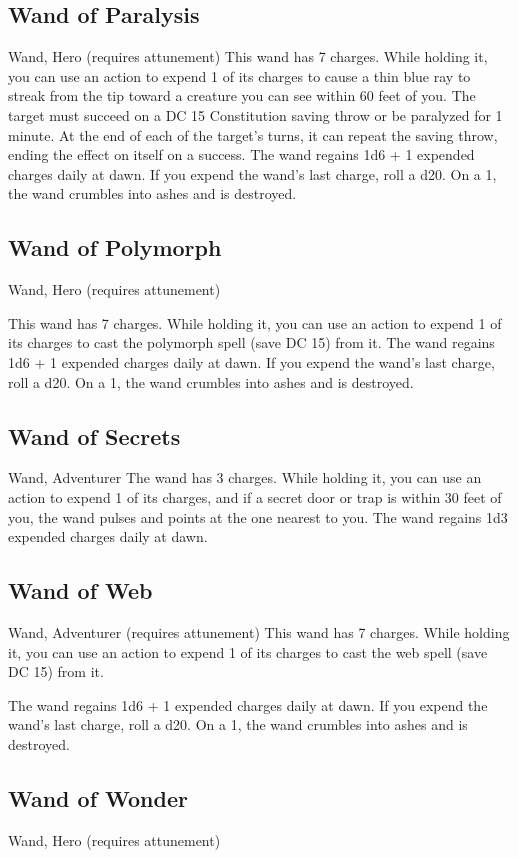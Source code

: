 \subsection{Wand of Paralysis}
Wand, Hero (requires attunement) This wand has 7 charges. While holding it, you can use an action to expend 1 of its charges to cause a thin blue ray to streak from the tip toward a creature you can see within 60 feet of you. The target must succeed on a DC 15 Constitution saving throw or be paralyzed for 1 minute. At the end of each of the target's turns, it can repeat the saving throw, ending the effect on itself on a success.  The wand regains 1d6 + 1 expended charges daily at dawn. If you expend the wand's last charge, roll a d20. On a 1, the wand crumbles into ashes and is destroyed.

\subsection{Wand of Polymorph}
Wand, Hero (requires attunement)

This wand has 7 charges. While holding it, you can use an action to expend 1 of its charges to cast the polymorph spell (save DC 15) from it.
The wand regains 1d6 + 1 expended charges daily at dawn. If you expend the wand's last charge, roll a d20. On a 1, the wand crumbles into ashes and is destroyed.

\subsection{Wand of Secrets}
Wand, Adventurer
The wand has 3 charges. While holding it, you can use an action to expend 1 of its charges, and if a secret door or trap is within 30 feet of you, the wand pulses and points at the one nearest to you. The wand regains 1d3 expended charges daily at dawn.

\subsection{Wand of Web}
Wand, Adventurer (requires attunement)
This wand has 7 charges. While holding it, you can use an action to expend 1 of its charges to cast the web spell (save DC 15) from it.

The wand regains 1d6 + 1 expended charges daily at dawn. If you expend the wand's last charge, roll a d20. On a 1, the wand crumbles into ashes and is destroyed.

\subsection{Wand of Wonder}
Wand, Hero (requires attunement)

